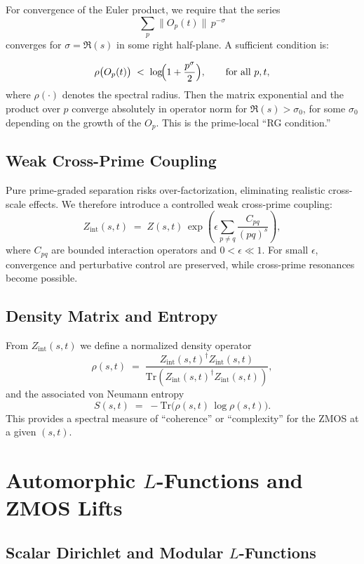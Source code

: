 \documentclass[11pt]{article}
\begin{document}
For convergence of the Euler product, we require that the series
\[
  \sum_{p} \bigl\| O_p(t) \bigr\|\, p^{-\sigma}
\]
converges for $\sigma = \Re(s)$ in some right half-plane. A sufficient
condition is:

\begin{equation}
  \rho\bigl(O_p(t)\bigr)
  \;<\; \log\!\Bigl(1 + \frac{p^\sigma}{2}\Bigr),
  \qquad \text{for all } p, t,
  \label{eq:spectral_bound}
\end{equation}
where $\rho(\cdot)$ denotes the spectral radius. Then the matrix
exponential and the product over $p$ converge absolutely in operator
norm for $\Re(s)>\sigma_0$, for some $\sigma_0$ depending on the growth
of the $O_p$. This is the prime-local ``RG condition.''

\subsection{Weak Cross-Prime Coupling}

Pure prime-graded separation risks over-factorization, eliminating
realistic cross-scale effects. We therefore introduce a controlled weak
cross-prime coupling:
\[
  Z_{\mathrm{int}}(s,t)
  \;=\; Z(s,t)\,
    \exp\!\left(
      \epsilon \sum_{p \neq q} \frac{C_{pq}}{(pq)^s}
    \right),
\]
where $C_{pq}$ are bounded interaction operators and
$0 < \epsilon \ll 1$. For small $\epsilon$, convergence and perturbative
control are preserved, while cross-prime resonances become possible.

\subsection{Density Matrix and Entropy}

From $Z_{\mathrm{int}}(s,t)$ we define a normalized density operator
\[
  \rho(s,t) \;=\;
  \frac{Z_{\mathrm{int}}(s,t)^\dagger
        Z_{\mathrm{int}}(s,t)}
       {\mathrm{Tr}(Z_{\mathrm{int}}(s,t)^\dagger
                   Z_{\mathrm{int}}(s,t))},
\]
and the associated von Neumann entropy
\[
  S(s,t)
  \;=\;
  -\mathrm{Tr}\bigl(\rho(s,t)\,\log \rho(s,t)\bigr).
\]
This provides a spectral measure of ``coherence'' or ``complexity''
for the ZMOS at a given $(s,t)$.

\section{Automorphic $L$-Functions and ZMOS Lifts}

\subsection{Scalar Dirichlet and Modular $L$-Functions}
\end{document}
